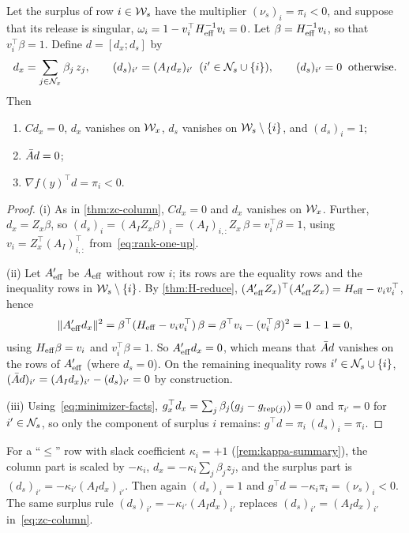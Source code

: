 \begin{theorem} \label{thm:zc-surplus}
Let the surplus of row $i\in\mathcal{W}_s$ have the multiplier $(\nu_s)_i = \pi_i < 0$, and suppose that
its release is singular, $\omega_i = 1 - v_i^\top H_{\mathrm{eff}}^{-1}v_i = 0$. Let $\beta = H_{\mathrm{eff}}^{-1}v_i$, so
that $v_i^\top\beta = 1$. Define $d = [d_x;d_s]$ by
\begin{equation} \label{eq:zc-surplus}
d_x = \sum_{j\in\mathcal{N}_x}\beta_j\,z_j,\qquad
(d_s)_{i'} = (A_Id_x)_{i'}\;\;(i'\in\mathcal{N}_s\cup\{i\}),\qquad (d_s)_{i'} = 0\;\;\text{otherwise}.
\end{equation}
Then
\begin{enumerate}
    \item \label{thm:zc-surplus:i} $Cd_x = 0$, $d_x$ vanishes on $\mathcal{W}_x$, $d_s$ vanishes on $\mathcal{W}_s\setminus\{i\}$, and $(d_s)_i = 1$;
    \item \label{thm:zc-surplus:ii} $\bar{A} d = 0$;
    \item \label{thm:zc-surplus:iii} $\nabla f(y)^\top d = \pi_i < 0$.
\end{enumerate}
\end{theorem}

\begin{proof}
(i) As in \cref{thm:zc-column}, $Cd_x = 0$ and $d_x$ vanishes on $\mathcal{W}_x$. Further, $d_x = Z_x\beta$,
so $(d_s)_i = (A_IZ_x\beta)_i = (A_I)_{i,:}Z_x\,\beta = v_i^\top\beta = 1$, using
$v_i = Z_x^\top(A_I)_{i,:}^\top$ from~\eqref{eq:rank-one-up}.

(ii) Let $A_{\mathrm{eff}}'$ be $A_{\mathrm{eff}}$ without row $i$; its rows are the equality rows and the inequality
rows in $\mathcal{W}_s\setminus\{i\}$. By \cref{thm:H-reduce}, $(A_{\mathrm{eff}}'Z_x)^\top(A_{\mathrm{eff}}'Z_x) = H_{\mathrm{eff}} - v_iv_i^\top$,
hence
\[
\lVert A_{\mathrm{eff}}'d_x\rVert^2 = \beta^\top(H_{\mathrm{eff}} - v_iv_i^\top)\,\beta = \beta^\top v_i - (v_i^\top\beta)^2 = 1 - 1 = 0,
\]
using $H_{\mathrm{eff}}\beta = v_i$ and $v_i^\top\beta = 1$. So $A_{\mathrm{eff}}'d_x = 0$, which means that $\bar{A} d$ vanishes
on the rows of $A_{\mathrm{eff}}'$ (where $d_s = 0$). On the remaining inequality rows
$i'\in\mathcal{N}_s\cup\{i\}$, $(\bar{A} d)_{i'} = (A_Id_x)_{i'} - (d_s)_{i'} = 0$ by construction.

(iii) Using~\eqref{eq:minimizer-facts}, $g_x^\top d_x = \sum_j\beta_j(g_j - g_{\operatorname{rep}(j)}) = 0$ and
$\pi_{i'} = 0$ for $i'\in\mathcal{N}_s$, so only the component of surplus $i$ remains:
$g^\top d = \pi_i\,(d_s)_i = \pi_i$.
\end{proof}

\begin{remark} \label{rem:zc-kappa}
For a ``$\le$'' row with slack coefficient $\kappa_i = +1$ (\cref{rem:kappa-summary}), the
column part is scaled by $-\kappa_i$, $d_x = -\kappa_i\sum_j\beta_jz_j$, and the surplus part is
$(d_s)_{i'} = -\kappa_{i'}(A_Id_x)_{i'}$. Then again $(d_s)_i = 1$ and
$g^\top d = -\kappa_i\pi_i = (\nu_s)_i < 0$. The same surplus rule
$(d_s)_{i'} = -\kappa_{i'}(A_Id_x)_{i'}$ replaces $(d_s)_{i'} = (A_Id_x)_{i'}$
in~\eqref{eq:zc-column}.
\end{remark}

